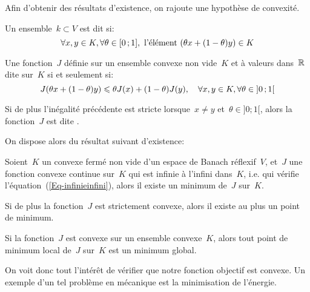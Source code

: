 \medskip
Afin d'obtenir des résultats d'existence, on rajoute une hypothèse de convexité.
\begin{definition}[Convexité]
Un ensemble~$k\subset V$ est dit  si:
\begin{equation}
\forall x,y\in K, \forall \theta\in \mathopen{[}0\,;1\mathclose{]}, \text{ l'élément }
(\theta x+(1-\theta)y) \in K
\end{equation}

Une fonction~$J$ définie sur un ensemble convexe non vide~$K$ et à valeurs dans~$\mathbb R$ dite  sur~$K$ si et seulement si:
\begin{equation}
J(\theta x+(1-\theta)y) \leqslant \theta J(x)+(1-\theta)J(y), \quad \forall x,y\in K, \forall \theta\in \mathopen{]}0\,;1\mathclose{[}
\end{equation}

Si de plus l'inégalité précédente est stricte lorsque~$x\ne y$ et~$\theta\in]0;1[$, alors la fonction~$J$ est dite .
\end{definition}
On dispose alors du résultat suivant d'existence:
\begin{theoreme}
Soient~$K$ un convexe fermé non vide d'un espace de Banach réflexif~$V$, et~$J$ une fonction convexe continue sur~$K$ qui est infinie à l'infini dans~$K$, i.e. qui vérifie l'équation~(\ref{Eq-infinieinfini}), alors il existe un minimum de~$J$ sur~$K$.
\end{theoreme}
\begin{remarque}[Remarques]
\par\noindent
{}
\par\noindent
{}
\end{remarque}
\begin{theoreme}
Si de plus la fonction~$J$ est strictement convexe, alors il existe au plus un point de minimum.
\end{theoreme}
\begin{theoreme}
Si la fonction~$J$ est convexe sur un ensemble convexe~$K$, alors tout point de minimum local de~$J$ sur~$K$ est un minimum global.
\end{theoreme}
On voit donc tout l'intérêt de vérifier que notre fonction objectif est convexe. Un exemple d'un tel problème en mécanique est la minimisation de l'énergie.

